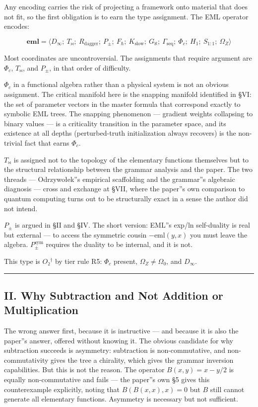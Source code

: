 \documentclass[12pt,a4paper]{article}
\newcommand{\pilcrow}{\S}
\begin{document}
Any encoding carries the risk of projecting a framework onto material that does
not fit, so the first obligation is to earn the type assignment. The EML operator
encodes:

\[
\mathbf{eml} = \langle D_{\infty};\ T_{\bowtie};\ R_\text{dagger};\ P_{\pm};\
F_{\hbar};\ K_\text{slow};\ G_{\aleph};\ \Gamma_\text{seq};\ \Phi_c;\ H_1;\
S_{1:1};\ \Omega_Z \rangle
\]

Most coordinates are uncontroversial. The assignments that require argument are
$\Phi_c$, $T_{\bowtie}$, and $P_{\pm}$, in that order of difficulty.

$\Phi_c$ in a functional algebra rather than a physical system is not an obvious
assignment. The critical manifold here is the snapping manifold identified in \pilcrow{}VI:
the set of parameter vectors in the master formula that correspond exactly to
symbolic EML trees. The snapping phenomenon --- gradient weights collapsing to
binary values --- is a criticality transition in the parameter space, and its
existence at all depths (perturbed-truth initialization always recovers) is the
non-trivial fact that earns $\Phi_c$.

$T_{\bowtie}$ is assigned not to the topology of the elementary functions themselves
but to the structural relationship between the grammar analysis and the paper.
The two threads --- Odrzywołek''s empirical scaffolding and the grammar''s algebraic
diagnosis --- cross and exchange at \pilcrow{}VII, where the paper''s own comparison to
quantum computing turns out to be structurally exact in a sense the author did
not intend.

$P_{\pm}$ is argued in \pilcrow{}II and \pilcrow{}IV. The short version: EML''s exp/ln self-duality is
real but external --- to access the symmetric cousin $-\text{eml}(y,x)$ you must
leave the algebra. $P_{\pm}^{\text{sym}}$ requires the duality to be internal,
and it is not.

This type is $O₂^\dagger$ by tier rule R5: $\Phi_c$ present, $\Omega_Z \neq
\Omega_0$, and $D_{\infty}$.

\begin{center}
\rule{0.5\textwidth}{0.4pt}
\end{center}

\subsection{II. Why Subtraction and Not Addition or Multiplication}

The wrong answer first, because it is instructive --- and because it is also the
paper''s answer, offered without knowing it. The obvious candidate for why
subtraction succeeds is asymmetry: subtraction is non-commutative, and
non-commutativity gives the tree a chirality, which gives the grammar inversion
capabilities. But this is not the reason. The operator $B(x,y) = x - y/2$ is
equally non-commutative and fails --- the paper''s own \pilcrow{}5 gives this counterexample
explicitly, noting that $B(B(x,x), x) = 0$ but $B$ still cannot generate all
elementary functions. Asymmetry is necessary but not sufficient.
\end{document}
